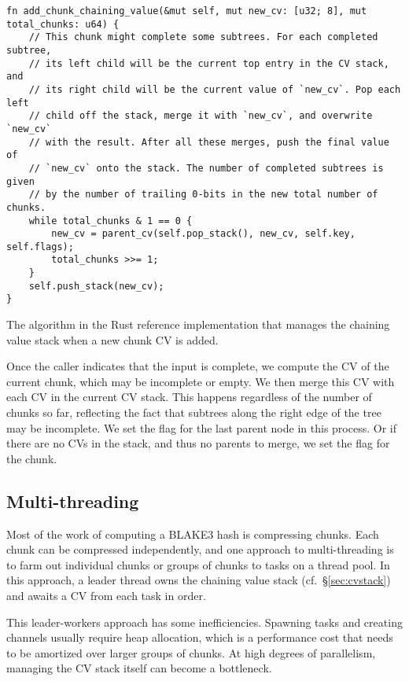\documentclass[11pt,notitlepage,a4paper]{article}
\newcommand{\flag}[1]{\texttt{\detokenize{#1}}\xspace}
\begin{document}
\begin{listing}[h]
\begin{verbatim}
fn add_chunk_chaining_value(&mut self, mut new_cv: [u32; 8], mut total_chunks: u64) {
    // This chunk might complete some subtrees. For each completed subtree,
    // its left child will be the current top entry in the CV stack, and
    // its right child will be the current value of `new_cv`. Pop each left
    // child off the stack, merge it with `new_cv`, and overwrite `new_cv`
    // with the result. After all these merges, push the final value of
    // `new_cv` onto the stack. The number of completed subtrees is given
    // by the number of trailing 0-bits in the new total number of chunks.
    while total_chunks & 1 == 0 {
        new_cv = parent_cv(self.pop_stack(), new_cv, self.key, self.flags);
        total_chunks >>= 1;
    }
    self.push_stack(new_cv);
}
\end{verbatim}
\caption{The algorithm in the Rust reference implementation that manages the
    chaining value stack when a new chunk CV is added.}
\label{listing:push_chunk_chaining_value}
\end{listing}

Once the caller indicates that the input is complete, we compute the CV of the
current chunk, which may be incomplete or empty. We then merge this CV with
each CV in the current CV stack. This happens regardless of the number of
chunks so far, reflecting the fact that subtrees along the right edge of the
tree may be incomplete. We set the \flag{ROOT} flag for the last parent node in
this process. Or if there are no CVs in the stack, and thus no parents to
merge, we set the \flag{ROOT} flag for the chunk.

\subsection{Multi-threading}\label{sec:multithreading}

Most of the work of computing a BLAKE3 hash is compressing chunks. Each chunk
can be compressed independently, and one approach to multi-threading is to farm
out individual chunks or groups of chunks to tasks on a thread pool. In this
approach, a leader thread owns the chaining value stack
(cf.~\S\ref{sec:cvstack}) and awaits a CV from each task in order.

This leader-workers approach has some inefficiencies. Spawning tasks and
creating channels usually require heap allocation, which is a performance cost
that needs to be amortized over larger groups of chunks. At high degrees of
parallelism, managing the CV stack itself can become a bottleneck.
\end{document}
